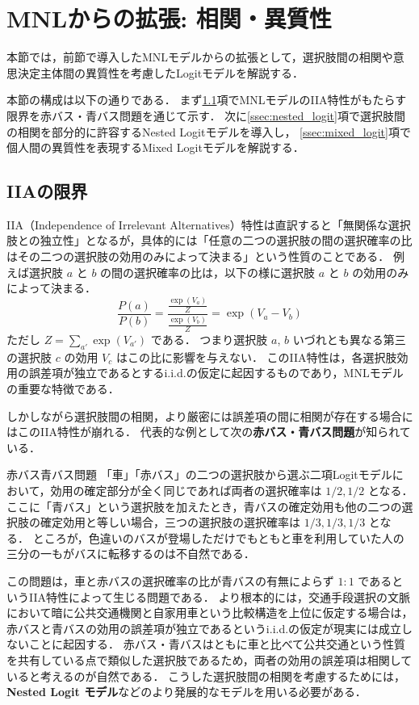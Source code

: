 \section{MNLからの拡張: 相関・異質性}\label{sec:correlation}
本節では，前節で導入したMNLモデルからの拡張として，選択肢間の相関や意思決定主体間の異質性を考慮したLogitモデルを解説する．

本節の構成は以下の通りである．
まず\ref{ssec:iia_limit}項でMNLモデルのIIA特性がもたらす限界を赤バス・青バス問題を通じて示す．
次に\ref{ssec:nested_logit}項で選択肢間の相関を部分的に許容するNested Logitモデルを導入し，
\ref{ssec:mixed_logit}項で個人間の異質性を表現するMixed Logitモデルを解説する．

\subsection{IIAの限界}\label{ssec:iia_limit}
IIA（Independence of Irrelevant Alternatives）特性は直訳すると「無関係な選択肢との独立性」となるが，具体的には「任意の二つの選択肢の間の選択確率の比はその二つの選択肢の効用のみによって決まる」という性質のことである．
例えば選択肢 $a$ と $b$ の間の選択確率の比は，以下の様に選択肢 $a$ と $b$ の効用のみによって決まる．
\begin{equation}
  \frac{P(a)}{P(b)} = \frac{\frac{\exp(V_a)}{Z}}{\frac{\exp(V_b)}{Z}} = \exp(V_a - V_b)
\end{equation}
ただし $Z = \sum_{a'} \exp(V_{a'})$ である．
つまり選択肢 $a$, $b$ いづれとも異なる第三の選択肢 $c$ の効用 $V_c$ はこの比に影響を与えない．
このIIA特性は，各選択肢効用の誤差項が独立であるとするi.i.d.の仮定に起因するものであり，MNLモデルの重要な特徴である．

しかしながら選択肢間の相関，より厳密には誤差項の間に相関が存在する場合にはこのIIA特性が崩れる．
代表的な例として次の\textbf{赤バス・青バス問題}が知られている．

\begin{itembox}[l]{赤バス青バス問題}
    「車」「赤バス」の二つの選択肢から選ぶ二項Logitモデルにおいて，効用の確定部分が全く同じであれば両者の選択確率は $1/2, 1/2$ となる．
    ここに「青バス」という選択肢を加えたとき，青バスの確定効用も他の二つの選択肢の確定効用と等しい場合，三つの選択肢の選択確率は $1/3, 1/3, 1/3$ となる．
    ところが，色違いのバスが登場しただけでもともと車を利用していた人の三分の一もがバスに転移するのは不自然である．
\end{itembox}

この問題は，車と赤バスの選択確率の比が青バスの有無によらず $1:1$ であるというIIA特性によって生じる問題である．
より根本的には，交通手段選択の文脈において暗に公共交通機関と自家用車という比較構造を上位に仮定する場合は，赤バスと青バスの効用の誤差項が独立であるというi.i.d.の仮定が現実には成立しないことに起因する．
赤バス・青バスはともに車と比べて公共交通という性質を共有している点で類似した選択肢であるため，両者の効用の誤差項は相関していると考えるのが自然である．
こうした選択肢間の相関を考慮するためには，\textbf{Nested Logit モデル}などのより発展的なモデルを用いる必要がある．


